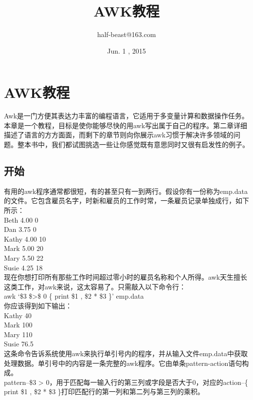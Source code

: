 \documentclass[10pt,fancyhdr,UTF-8]{ctexart}
\title{AWK教程}
\author{half-beast@163.com}
\date{Jun. 1 , 2015}
\begin{document}
\maketitle
\section{AWK教程}
\indent Awk是一门方便其表达力丰富的编程语言，它适用于多变量计算和数据操作任务。本章是一个教程，目标是使你能够尽快的用awk写出属于自己的程序。第二章详细描述了语言的方方面面，而剩下的章节则向你展示awk习惯于解决许多领域的问题。整本书中，我们都试图挑选一些让你感觉既有意思同时又很有启发性的例子。\par
\subsection{开始}
\indent 有用的awk程序通常都很短，有的甚至只有一到两行。假设你有一份称为emp.data的文件。它包含雇员名字，时新和雇员的工作时常，一条雇员记录单独成行，如下所示：\\
\indent Beth 4.00 0\\
\indent Dan  3.75 0\\
\indent Kathy 4.00 10\\
\indent Mark 5.00 20\\
\indent Mary 5.50 22\\
\indent Susie 4.25 18\\
现在你想打印所有那些工作时间超过零小时的雇员名称和个人所得。awk天生擅长这类工作，对awk来说，这太容易了。只需敲入以下命令行：\\
awk `\$3 \$>\$ 0 \{ print \$1 , \$2  *  \$3  \}' emp.data \\
你应该得到如下输出：\\
\indent Kathy   40\\
\indent Mark    100\\
\indent Mary    110\\
\indent Susie   76.5\\
\indent 这条命令告诉系统使用awk来执行单引号内的程序，并从输入文件emp.data中获取处理数据。单引号中的内容是一条完整的awk程序。它由单条pattern-action语句构成。\\
pattern--\$3 > 0，用于匹配每一输入行的第三列或字段是否大于0，对应的action--\{ print \$1 , \$2 * \$3  \}打印匹配行的第一列和第二列与第三列的乘积。\\
\end{document}
